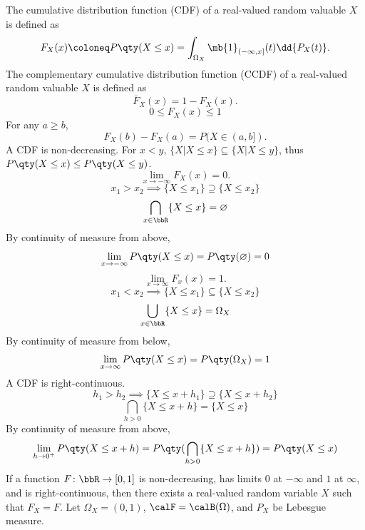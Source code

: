 \documentclass[a4paper,12pt]{report}
\begin{document}
The cumulative distribution function (CDF) of a real-valued random valuable $X$ is defined as
\[F_X(x)\coloneq P\qty(X\le x)=\int_{\Omega_X}\mb{1}_{(-\infty,x]}(t)\dd{P_X(t)}.\]
The complementary cumulative distribution function (CCDF) of a real-valued random valuable $X$ is defined as
\[\bar{F}_X(x)=1-F_X(x).\]
\[0\le F_X(x)\le 1\]
For any $a\ge b$,
\[F_X(b)-F_X(a)=P(X\in(a,b]).\]
A CDF is non-decreasing.
\bpr
For $x<y$, $\{X|X\le x\}\subseteq\{X|X\le y\}$, thus $P\qty(X\le x)\le P\qty(X\le y)$.
\epr
{}
\[\lim_{x\to-\infty}F_X(x)=0.\]
\bpr
\[x_1>x_2\implies\{X\le x_1\}\supseteq\{X\le x_2\}\]
\[\bigcap_{x\in\bbR}\{X\le x\}=\varnothing\]
By continuity of measure from above,
\[\lim_{x\to-\infty}P\qty(X\le x)=P\qty(\varnothing)=0\]
\epr
{}
\[\lim_{x\to\infty}F_x(x)=1.\]
\bpr
\[x_1<x_2\implies\{X\le x_1\}\subseteq\{X\le x_2\}\]
\[\bigcup_{x\in\bbR}\{X\le x\}=\Omega_X\]
By continuity of measure from below,
\[\lim_{x\to\infty}P\qty(X\le x)=P\qty(\Omega_X)=1\]
\epr
{}
A CDF is right-continuous.
\bpr
\[h_1>h_2\implies\{X\le x+h_1\}\supseteq\{X\le x+h_2\}\]
\[\bigcap_{h>0}\{X\le x+h\}=\{X\le x\}\]
By continuity of measure from above,
\[\lim_{h\to 0^+}P\qty(X\le x+h)=P\qty(\bigcap_{h>0}\{X\le x+h\})=P\qty(X\le x)\]
\epr
{}
If a function $F\colon\bbR\to[0,1]$ is non-decreasing, has limits $0$ at $-\infty$ and $1$ at $\infty$, and is right-continuous, then there exists a real-valued random variable $X$ such that $F_X=F$.
\bpr
Let $\Omega_X=(0,1)$, $\calF=\calB(\Omega)$, and $P_X$ be Lebesgue measure.
\end{document}
